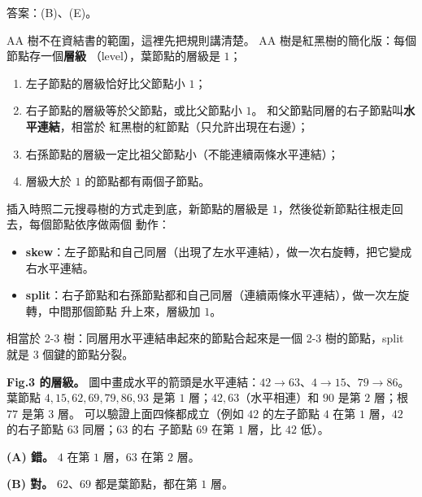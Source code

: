 \begin{pastsoln}
答案：(B)、(E)。

AA 樹不在資結書的範圍，這裡先把規則講清楚。 AA 樹是紅黑樹的簡化版：每個節點存一個\textbf{層級}
（level），葉節點的層級是 $1$；
\begin{enumerate}
\item 左子節點的層級恰好比父節點小 $1$；
\item 右子節點的層級等於父節點，或比父節點小 $1$。 和父節點同層的右子節點叫\textbf{水平連結}，相當於
紅黑樹的紅節點（只允許出現在右邊）；
\item 右孫節點的層級一定比祖父節點小（不能連續兩條水平連結）；
\item 層級大於 $1$ 的節點都有兩個子節點。
\end{enumerate}
插入時照二元搜尋樹的方式走到底，新節點的層級是 $1$，然後從新節點往根走回去，每個節點依序做兩個
動作：
\begin{itemize}
\item \textbf{skew}：左子節點和自己同層（出現了左水平連結），做一次右旋轉，把它變成右水平連結。
\item \textbf{split}：右子節點和右孫節點都和自己同層（連續兩條水平連結），做一次左旋轉，中間那個節點
升上來，層級加 $1$。
\end{itemize}
相當於 2-3 樹：同層用水平連結串起來的節點合起來是一個 2-3 樹的節點，split 就是 3 個鍵的節點分裂。

\textbf{Fig.3 的層級。} 圖中畫成水平的箭頭是水平連結：$42 \to 63$、$4 \to 15$、$79 \to 86$。 葉節點
$4, 15, 62, 69, 79, 86, 93$ 是第 $1$ 層；$42, 63$（水平相連）和 $90$ 是第 $2$ 層；根 $77$ 是第 $3$ 層。
可以驗證上面四條都成立（例如 $42$ 的左子節點 $4$ 在第 $1$ 層，$42$ 的右子節點 $63$ 同層；$63$ 的右
子節點 $69$ 在第 $1$ 層，比 $42$ 低）。

\textbf{(A) 錯。} $4$ 在第 $1$ 層，$63$ 在第 $2$ 層。

\textbf{(B) 對。} $62$、$69$ 都是葉節點，都在第 $1$ 層。


\end{pastsoln}
